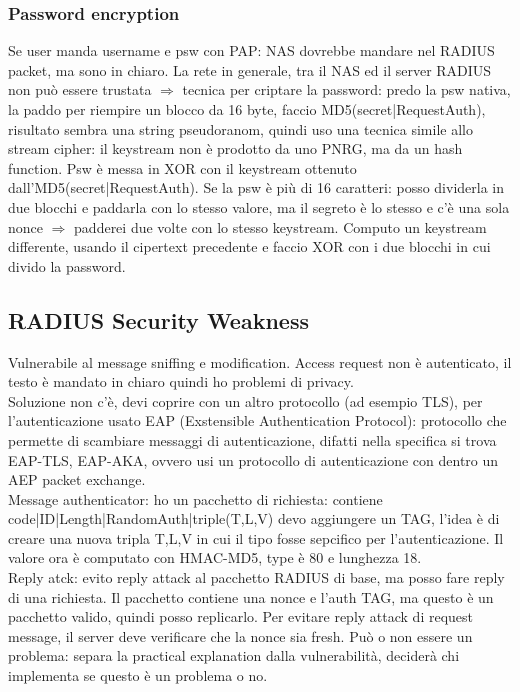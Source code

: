 \documentclass[16px]{article}
\begin{document}
\subsubsection{Password encryption}
Se user manda username e psw con PAP: NAS dovrebbe mandare nel RADIUS packet, ma sono in chiaro. La rete in generale, tra il NAS ed il server RADIUS non può essere trustata $\Rightarrow$ tecnica per criptare la password: predo la psw nativa, la paddo per riempire un blocco da 16 byte, faccio MD5(secret|RequestAuth), risultato sembra una string pseudoranom, quindi uso una tecnica simile allo stream cipher: il keystream non è prodotto da uno PNRG, ma da un hash function. Psw è messa in XOR con il keystream ottenuto dall'MD5(secret|RequestAuth). Se la psw è più di 16 caratteri: posso dividerla in due blocchi e paddarla con lo stesso valore, ma il segreto è lo stesso e c'è una sola nonce $\Rightarrow$ padderei due volte con lo stesso keystream. Computo un keystream differente, usando il cipertext precedente e faccio XOR con i due blocchi in cui divido la password.
\subsection{RADIUS Security Weakness}
Vulnerabile al message sniffing e modification. Access request non è autenticato, il testo è mandato in chiaro quindi ho problemi di privacy.\\ Soluzione non c'è, devi coprire con un altro protocollo (ad esempio TLS), per l'autenticazione usato EAP (Exstensible Authentication Protocol): protocollo che permette di scambiare messaggi di autenticazione, difatti nella specifica si trova EAP-TLS, EAP-AKA, ovvero usi un protocollo di autenticazione con dentro un AEP packet exchange.\\ Message authenticator: ho un pacchetto di richiesta: contiene code|ID|Length|RandomAuth|triple(T,L,V) devo aggiungere un TAG, l'idea è di creare una nuova tripla T,L,V in cui il tipo fosse sepcifico per l'autenticazione. Il valore ora è computato con HMAC-MD5, type è 80 e lunghezza 18.\\ Reply atck: evito reply attack al pacchetto RADIUS di base, ma posso fare reply di una richiesta. Il pacchetto contiene una nonce e l'auth TAG, ma questo è un pacchetto valido, quindi posso replicarlo. Per evitare reply attack di request message, il server deve verificare che la nonce sia fresh. Può o non essere un problema: separa la practical explanation dalla vulnerabilità, deciderà chi implementa se questo è un problema o no.
\end{document}
